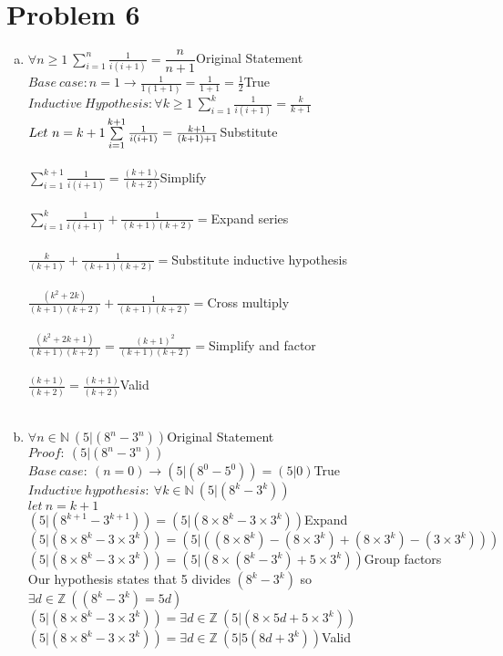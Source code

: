 \documentclass[11pt,letterpaper]{article}
\begin{document}
\clearpage
\section*{Problem 6}
\begin{enumerate}[(a)]
\item
$\forall n\geq 1~\sum\limits_{i=1}^n\frac{1}{i(i+1)} = \dfrac{n}{n+1}$\hfill Original Statement\\
$Base~case:n=1\rightarrow\frac{1}{1(1+1)}=\frac{1}{1+1} = \frac{1}{2}$\hfill True\\
$Inductive~ Hypothesis: \forall k\geq 1~\sum\limits_{i=1}^k\frac{1}{i(i+1)} = \frac{k}{k+1}$\\
$Let~ n=k+1\\
\\
\sum\limits_{i=1}^{k+1}\frac{1}{i(i+1)} = \frac{k+1}{(k+1)+1}$\hfill Substitute\\
\\
$\sum\limits_{i=1}^{k+1}\frac{1}{i(i+1)} = \frac{(k+1)}{(k+2)}$\hfill Simplify\\
\\
$\sum\limits_{i=1}^{k}\frac{1}{i(i+1)} + \frac{1}{(k+1)(k+2)}= $\hfill Expand series\\
\\
$\frac{k}{(k+1)} + \frac{1}{(k+1)(k+2)}= $\hfill Substitute inductive hypothesis\\
\\
$\frac{(k^2+2k)}{(k+1)(k+2)} + \frac{1}{(k+1)(k+2)}= $\hfill Cross multiply\\
\\
$\frac{(k^2+2k + 1)}{(k+1)(k+2)} = \frac{(k+1)^2}{(k+1)(k+2)}=$\hfill Simplify and factor\\
\\
$\frac{(k+1)}{(k+2)} =\frac{(k+1)}{(k+2)}$\hfill Valid\\
\\
\item
$\forall n\in\mathbb{N}~(5|(8^n - 3^n))$\hfill Original Statement\\
$Proof:~(5|(8^n - 3^n))$\\
$Base~case:~(n=0)\rightarrow(5|(8^0-5^0))= (5|0)$\hfill True\\
$Inductive~hypothesis:~\forall k\in\mathbb{N}~(5|(8^k - 3^k))$\\
$let ~n =k+1$\\
$(5|(8^{k+1} - 3^{k+1}))= (5|(8\times 8^{k} - 3\times 3^{k}))$\hfill Expand\\
$(5|(8\times 8^{k} - 3\times 3^{k}))= (5|((8\times 8^{k}) - (8\times 3^{k}) +(8\times 3^{k})- (3\times 3^{k})))$\\
$(5|(8\times 8^{k} - 3\times 3^{k}))= (5|(8\times (8^k -3^{k}) +5\times 3^{k}))$\hfill Group factors\\
Our hypothesis states that 5 divides $(8^k - 3^k)$ so $\exists d\in\mathbb{Z}~((8^k-3^k)=5d)$\\
$(5|(8\times 8^{k} - 3\times 3^{k}))= \exists d\in\mathbb{Z}~(5|(8\times 5d +5\times 3^{k}))$\\
$(5|(8\times 8^{k} - 3\times 3^{k}))= \exists d\in\mathbb{Z}~(5|5(8d + 3^{k}))$\hfill Valid\\

\end{enumerate}
\clearpage
\end{document}
